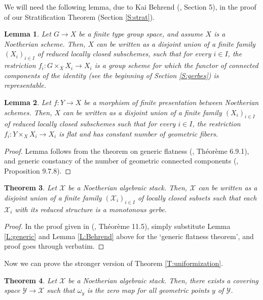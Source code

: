 \documentclass{amsart}
\newtheorem{thm}{Theorem}[section]
\newtheorem{lem}[thm]{Lemma}
\theoremstyle{definition}
\theoremstyle{remark}
\theoremstyle{remark}
\newcommand{\X}{\mathcal{X}}
\newcommand{\Y}{\mathcal{Y}}
\newcommand{\oy}{\omega_y}
\newcommand{\x}{\times}
\let\:=\colon
\begin{document}
 We will need the following lemma, due to Kai Behrend
 (\cite{Behrend}, Section 5), in the proof of our Stratification
 Theorem (Section \ref{S:strat}).

 \begin{lem}{\label{L:Behrend}}
  Let $G \to X$ be a  finite type group space, and assume $X$ is a Noetherian scheme.
  Then,  $X$ can be written as a disjoint union of  a finite
  family $(X_i)_{i \in I}$ of  reduced locally closed
 subschemes, such that for every $i \in I$, the restriction $f_i \: G \x_X {X_i} \to X_i$ is a group scheme
 for which the functor of {\em connected  components of the identity}
  (see the beginning of  Section \ref{S:gerbes}) is representable.
  \end{lem}

 \begin{lem}{\label{L:generic}}
 Let $f \: Y \to X$ be a morphism of finite presentation between Noetherian schemes. Then,
 $X$ can be written as a disjoint union of  a finite family $(X_i)_{i \in I}$ of  reduced locally closed
 subschemes such that for every $i \in I$, the restriction $f_i \: Y \x_X {X_i} \to X_i$ is  flat and has
 constant number of geometric fibers.
 \end{lem}

 \begin{proof}
 Lemma follows from the theorem on generic flatness (\cite{EGA4}, Th\'{e}or\`{e}me 6.9.1), and generic
 constancy of the number of geometric connected components (\cite{EGA4}, Proposition 9.7.8).
 \end{proof}

 \begin{thm}{\label{T:strat}}
 Let $\X$ be a Noetherian algebraic stack. Then, $\X$ can be written as a disjoint union of
 a finite family $(\X_i)_{i \in I}$ of locally closed subsets such that each $\X_i$ with its
 reduced structure is a monotonous gerbe.
 \end{thm}

 \begin{proof}
 In the proof given in (\cite{LM}, Th\'{e}or\`{e}me 11.5), simply substitute Lemma \ref{L:generic} and Lemma
 \ref{L:Behrend} above for the  `generic flatness theorem', and proof goes through verbatim.
 \end{proof}


Now we can prove the stronger version of Theorem
\ref{T:uniformization}.

\begin{thm}{\label{T:main}}
Let $\X$ be a Noetherian algebraic stack. Then, there exists a
covering space $\Y \to \X$ such that $\oy$ is the zero map for all
geometric points $y$ of $\Y$.
\end{thm}
\end{document}
